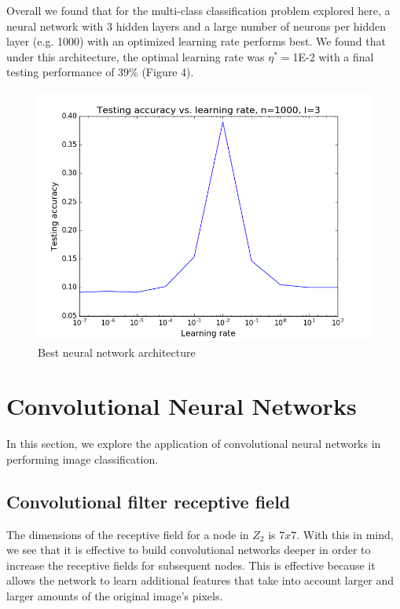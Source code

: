 \documentclass{article}
\begin{document}
Overall we found that for the multi-class classification problem explored here, a neural network with 3 hidden layers and a large number of neurons per hidden layer (e.g. 1000) with an optimized learning rate performs best. We found that under this architecture, the optimal learning rate was $\eta^*=$1\textsc{E}-2 with a final testing performance of 39\% (Figure 4).

\begin{figure}[width=\linewidth]
\centering
  \includegraphics[width=0.8\linewidth]{code/P1/accuracy_vs_learning_rate,mnist,(1000,1000,1000).png}
\caption{Best neural network architecture}
\end{figure}


\section{Convolutional Neural Networks}
In this section, we explore the application of convolutional neural networks in performing image classification.

\subsection{Convolutional filter receptive field}
The dimensions of the receptive field for a node in $Z_2$ is $7 x 7$. With this in mind, we see that it is effective to build convolutional networks deeper in order to increase the receptive fields for subsequent nodes. This is effective because it allows the network to learn additional features that take into account larger and larger amounts of the original image's pixels.
\end{document}
